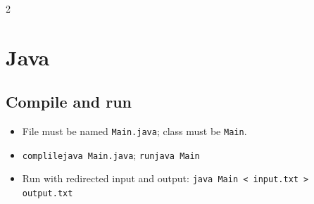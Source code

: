 \documentclass[10pt]{article}
\newcommand{\cmd}[1]{\texttt{\small #1}}
\newcommand{\code}[1]{\texttt{#1}}
\begin{document}
\newpage
\begin{multicols}{2}

\section{Java}
\subsection{Compile and run}
\begin{itemize}
  \item File must be named \code{Main.java}; class must be \code{Main}.
  \item \cmd{complilejava Main.java}; \cmd{runjava Main}
  \item Run with redirected input and output:
    \cmd{java Main < input.txt > output.txt}
\end{itemize}

\end{multicols}
\end{document}
